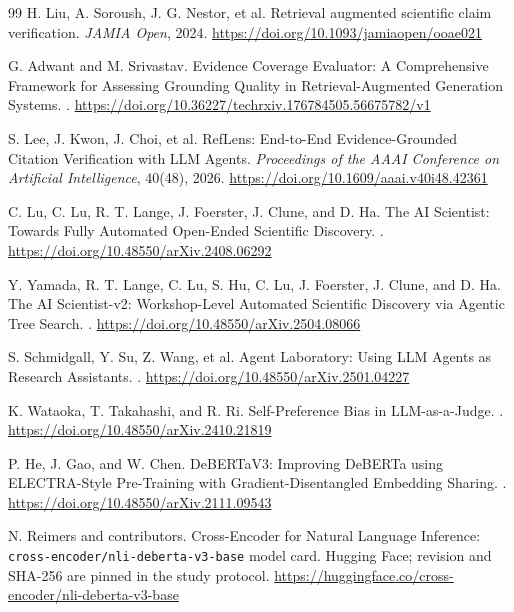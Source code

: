 \documentclass[11pt]{article}
\begin{document}
\begin{thebibliography}{99}
H. Liu, A. Soroush, J. G. Nestor, et al.
\newblock Retrieval augmented scientific claim verification.
\newblock \emph{JAMIA Open}, 2024. \url{https://doi.org/10.1093/jamiaopen/ooae021}

G. Adwant and M. Srivastav.
\newblock Evidence Coverage Evaluator: A Comprehensive Framework for Assessing Grounding Quality in Retrieval-Augmented Generation Systems.
. \url{https://doi.org/10.36227/techrxiv.176784505.56675782/v1}

S. Lee, J. Kwon, J. Choi, et al.
\newblock RefLens: End-to-End Evidence-Grounded Citation Verification with LLM Agents.
\newblock \emph{Proceedings of the AAAI Conference on Artificial Intelligence}, 40(48), 2026. \url{https://doi.org/10.1609/aaai.v40i48.42361}

C. Lu, C. Lu, R. T. Lange, J. Foerster, J. Clune, and D. Ha.
\newblock The AI Scientist: Towards Fully Automated Open-Ended Scientific Discovery.
. \url{https://doi.org/10.48550/arXiv.2408.06292}

Y. Yamada, R. T. Lange, C. Lu, S. Hu, C. Lu, J. Foerster, J. Clune, and D. Ha.
\newblock The AI Scientist-v2: Workshop-Level Automated Scientific Discovery via Agentic Tree Search.
. \url{https://doi.org/10.48550/arXiv.2504.08066}

S. Schmidgall, Y. Su, Z. Wang, et al.
\newblock Agent Laboratory: Using LLM Agents as Research Assistants.
. \url{https://doi.org/10.48550/arXiv.2501.04227}

K. Wataoka, T. Takahashi, and R. Ri.
\newblock Self-Preference Bias in LLM-as-a-Judge.
. \url{https://doi.org/10.48550/arXiv.2410.21819}

P. He, J. Gao, and W. Chen.
\newblock DeBERTaV3: Improving DeBERTa using ELECTRA-Style Pre-Training with Gradient-Disentangled Embedding Sharing.
. \url{https://doi.org/10.48550/arXiv.2111.09543}

N. Reimers and contributors.
\newblock Cross-Encoder for Natural Language Inference: \texttt{cross-encoder/nli-deberta-v3-base} model card.
\newblock Hugging Face; revision and SHA-256 are pinned in the study protocol. \url{https://huggingface.co/cross-encoder/nli-deberta-v3-base}

\end{thebibliography}
\end{document}
